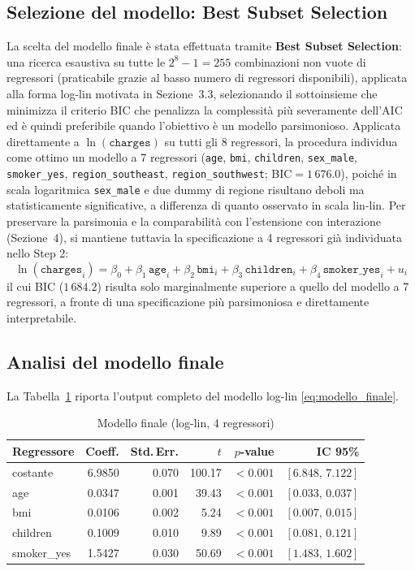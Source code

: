 \documentclass[11pt,a4paper]{article}
\begin{document}
\subsection{Selezione del modello: Best Subset Selection}
La scelta del modello finale è stata effettuata tramite \textbf{Best
Subset Selection}: una ricerca esaustiva su tutte le $2^8-1=255$
combinazioni non vuote di regressori (praticabile grazie al basso numero
di regressori disponibili), applicata alla forma log-lin motivata in
Sezione~3.3, selezionando il sottoinsieme che minimizza il criterio BIC
che penalizza la complessità più severamente dell'AIC ed è quindi
preferibile quando l'obiettivo è un modello parsimonioso. Applicata
direttamente a $\ln(\texttt{charges})$ su tutti gli 8 regressori, la
procedura individua come ottimo un modello a 7 regressori (\texttt{age},
\texttt{bmi}, \texttt{children}, \texttt{sex\_male}, \texttt{smoker\_yes},
\texttt{region\_southeast}, \texttt{region\_southwest}; BIC$=1\,676.0$),
poiché in scala logaritmica \texttt{sex\_male} e due dummy di regione
risultano deboli ma statisticamente significative, a differenza di quanto
osservato in scala lin-lin. Per preservare la parsimonia e la
comparabilità con l'estensione con interazione (Sezione~4), si mantiene
tuttavia la specificazione a 4 regressori già individuata nello Step 2:
\begin{equation}
\ln(\texttt{charges}_i) = \beta_0 + \beta_1\,\texttt{age}_i + \beta_2\,\texttt{bmi}_i
+ \beta_3\,\texttt{children}_i + \beta_4\,\texttt{smoker\_yes}_i + u_i
\label{eq:modello_finale}
\end{equation}
il cui BIC ($1\,684.2$) risulta solo marginalmente superiore a quello del
modello a 7 regressori, a fronte di una specificazione più parsimoniosa e
direttamente interpretabile.

\subsection{Analisi del modello finale}
\label{sec:modello_finale}
La Tabella~\ref{tab:modello_finale} riporta l'output completo del modello
log-lin \eqref{eq:modello_finale}.

\begin{table}[H]
\centering
\caption{Modello finale (log-lin, 4 regressori)}
\label{tab:modello_finale}
\begin{tabular}{lrrrrr}
\toprule
Regressore & Coeff. & Std.\,Err. & $t$ & $p$-value & IC 95\% \\
\midrule
costante    & 6.9850 & 0.070 & 100.17 & $<0.001$ & $[6.848,\,7.122]$ \\
age         & 0.0347 & 0.001 & 39.43  & $<0.001$ & $[0.033,\,0.037]$ \\
bmi         & 0.0106 & 0.002 & 5.24   & $<0.001$ & $[0.007,\,0.015]$ \\
children    & 0.1009 & 0.010 & 9.89   & $<0.001$ & $[0.081,\,0.121]$ \\
smoker\_yes & 1.5427 & 0.030 & 50.69  & $<0.001$ & $[1.483,\,1.602]$ \\
\bottomrule
\end{tabular}
\end{table}
\end{document}
